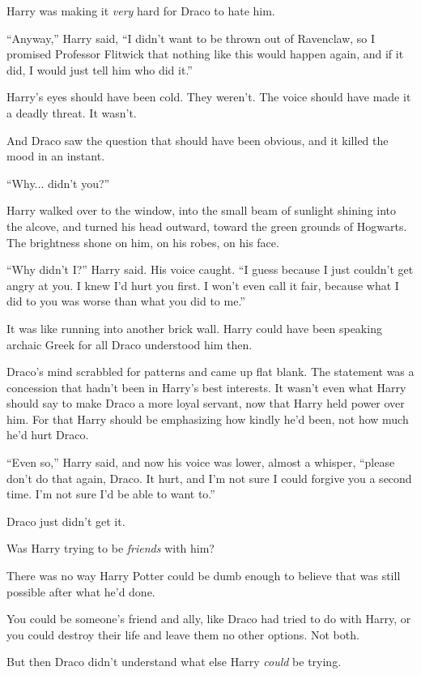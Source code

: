Harry was making it \emph{very} hard for Draco to hate him.

``Anyway,'' Harry said, ``I didn't want to be thrown out of Ravenclaw,
so I promised Professor Flitwick that nothing like this would happen
again, and if it did, I would just tell him who did it.''

Harry's eyes should have been cold. They weren't. The voice should have
made it a deadly threat. It wasn't.

And Draco saw the question that should have been obvious, and it killed
the mood in an instant.

``Why... didn't you?''

Harry walked over to the window, into the small beam of sunlight shining
into the alcove, and turned his head outward, toward the green grounds
of Hogwarts. The brightness shone on him, on his robes, on his face.

``Why didn't I?'' Harry said. His voice caught. ``I guess because I just
couldn't get angry at you. I knew I'd hurt you first. I won't even call
it fair, because what I did to you was worse than what you did to me.''

It was like running into another brick wall. Harry could have been
speaking archaic Greek for all Draco understood him then.

Draco's mind scrabbled for patterns and came up flat blank. The
statement was a concession that hadn't been in Harry's best interests.
It wasn't even what Harry should say to make Draco a more loyal servant,
now that Harry held power over him. For that Harry should be emphasizing
how kindly he'd been, not how much he'd hurt Draco.

``Even so,'' Harry said, and now his voice was lower, almost a whisper,
``please don't do that again, Draco. It hurt, and I'm not sure I could
forgive you a second time. I'm not sure I'd be able to want to.''

Draco just didn't get it.

Was Harry trying to be \emph{friends} with him?

There was no way Harry Potter could be dumb enough to believe that was
still possible after what he'd done.

You could be someone's friend and ally, like Draco had tried to do with
Harry, or you could destroy their life and leave them no other options.
Not both.

But then Draco didn't understand what else Harry \emph{could} be trying.

